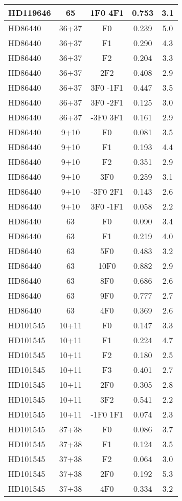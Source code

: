\begin{table*}
\begin{tabular}{l c c c c}
HD119646 & 65 & 1F0 4F1 & 0.753 & 3.1\\ 
\hline
HD86440 & 36+37 & F0 & 0.239 & 5.0\\ 
HD86440 & 36+37 & F1 & 0.290 & 4.3\\ 
HD86440 & 36+37 & F2 & 0.204 & 3.3\\ 
HD86440 & 36+37 & 2F2 & 0.408 & 2.9\\ 
HD86440 & 36+37 & 3F0 -1F1 & 0.447 & 3.5\\ 
HD86440 & 36+37 & 3F0 -2F1 & 0.125 & 3.0\\ 
HD86440 & 36+37 & -3F0 3F1 & 0.161 & 2.9\\ 
\hline
HD86440 & 9+10 & F0 & 0.081 & 3.5\\ 
HD86440 & 9+10 & F1 & 0.193 & 4.4\\ 
HD86440 & 9+10 & F2 & 0.351 & 2.9\\ 
HD86440 & 9+10 & 3F0 & 0.259 & 3.1\\ 
HD86440 & 9+10 & -3F0 2F1 & 0.143 & 2.6\\ 
HD86440 & 9+10 & 3F0 -1F1 & 0.058 & 2.2\\ 
\hline
HD86440 & 63 & F0 & 0.090 & 3.4\\ 
HD86440 & 63 & F1 & 0.219 & 4.0\\ 
HD86440 & 63 & 5F0 & 0.483 & 3.2\\ 
HD86440 & 63 & 10F0 & 0.882 & 2.9\\ 
HD86440 & 63 & 8F0 & 0.686 & 2.6\\ 
HD86440 & 63 & 9F0 & 0.777 & 2.7\\ 
HD86440 & 63 & 4F0 & 0.369 & 2.6\\ 
\hline
HD101545 & 10+11 & F0 & 0.147 & 3.3\\ 
HD101545 & 10+11 & F1 & 0.224 & 4.7\\ 
HD101545 & 10+11 & F2 & 0.180 & 2.5\\ 
HD101545 & 10+11 & F3 & 0.401 & 2.7\\ 
HD101545 & 10+11 & 2F0 & 0.305 & 2.8\\ 
HD101545 & 10+11 & 3F2 & 0.541 & 2.2\\ 
HD101545 & 10+11 & -1F0 1F1 & 0.074 & 2.3\\ 
\hline
HD101545 & 37+38 & F0 & 0.086 & 3.7\\ 
HD101545 & 37+38 & F1 & 0.124 & 3.5\\ 
HD101545 & 37+38 & F2 & 0.064 & 3.0\\ 
HD101545 & 37+38 & 2F0 & 0.192 & 5.3\\ 
HD101545 & 37+38 & 4F0 & 0.334 & 3.2\\ 

\end{tabular}
\end{table*}
